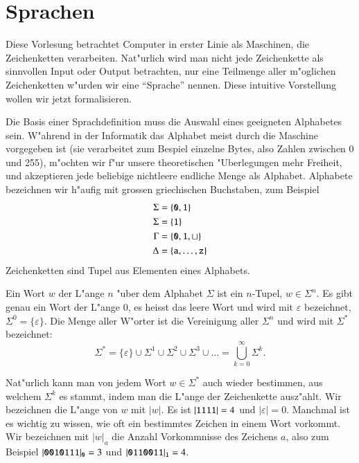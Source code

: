 %
%
%
\chapter{Sprachen\label{chapter-sprachen}}
Diese Vorlesung betrachtet Computer in erster Linie als
Maschinen, die Zeichenketten verarbeiten. Nat"urlich wird man
nicht jede Zeichenkette als sinnvollen Input oder Output betrachten,
nur eine Teilmenge aller m"oglichen Zeichenketten w"urden wir
eine ``Sprache'' nennen. Diese intuitive Vorstellung wollen wir
jetzt formalisieren.

Die Basis einer Sprachdefinition muss die Auswahl eines geeigneten
Alphabetes sein. W"ahrend in der Informatik das Alphabet meist 
durch die Maschine vorgegeben ist (sie verarbeitet zum Bespiel
einzelne Bytes, also Zahlen zwischen 0 und 255), m"ochten wir f"ur
unsere theoretischen "Uberlegungen mehr Freiheit, und akzeptieren
jede beliebige nichtleere endliche Menge als Alphabet. Alphabete
bezeichnen wir h"aufig mit grossen griechischen Buchstaben, zum
Beispiel
\begin{align*}
\Sigma&=\{{\tt 0},{\tt 1}\}\\
\Sigma&=\{{\tt 1}\}\\
\Gamma&=\{{\tt 0},{\tt 1},\sqcup\}\\
\Delta&=\{{\tt a},\dots,{\tt z}\}
\end{align*}
Zeichenketten sind Tupel aus Elementen eines Alphabets.
\begin{definition}\label{def_wort}
Ein Wort $w$ der L"ange $n$ "uber dem Alphabet $\Sigma$ ist ein $n$-Tupel,
$w\in\Sigma^n$. Es gibt genau ein Wort der L"ange $0$, es heisst das
leere Wort und wird mit $\varepsilon$ bezeichnet, $\Sigma^0=\{\varepsilon\}$.
Die Menge aller W"orter
ist die Vereinigung aller $\Sigma^n$ und wird mit $\Sigma^*$ bezeichnet:
\[
\Sigma^*=\{\varepsilon\}\cup \Sigma^1\cup\Sigma^2\cup\Sigma^3\cup\dots
=\bigcup_{k=0}^\infty\Sigma^k.
\]
\end{definition}

Nat"urlich kann man von jedem Wort $w\in\Sigma^*$ auch wieder bestimmen,
aus welchem $\Sigma^k$ es stammt, indem man die L"ange der Zeichenkette
ausz"ahlt. Wir bezeichnen die L"ange von $w$ mit $|w|$. Es ist $|{\tt 1111}|=4$
und $|\varepsilon|=0$. Manchmal ist es wichtig zu wissen, wie oft ein bestimmtes
Zeichen in einem Wort vorkommt. Wir bezeichnen mit
$|w|_{a}$ die Anzahl Vorkommnisse des Zeichens $a$, also zum Beispiel
$|{\tt 0010111}|_{\tt 0}=3$ und $|{\tt 0110011}|_{\tt 1}=4$.

